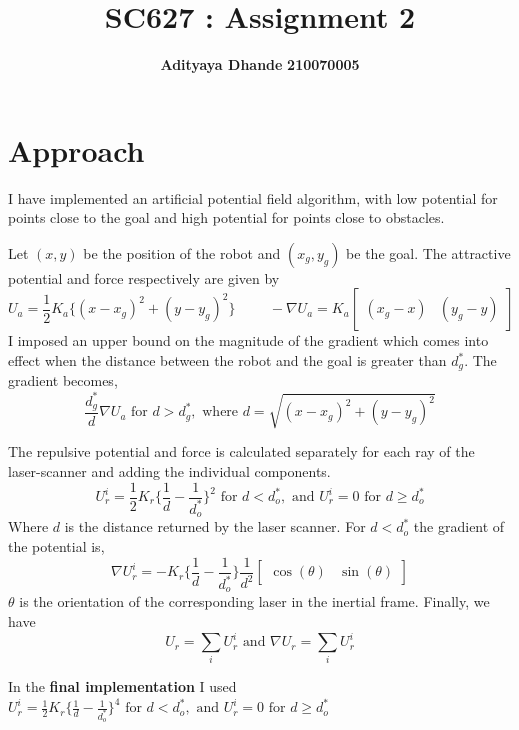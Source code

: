 \documentclass[11pt]{article}
\title{\textbf{SC627 : Assignment 2}}
\author{\textbf{Adityaya Dhande}   \hspace{8mm} \textbf{210070005}}
\date{}
\begin{document}
\maketitle
\noindent
\section{Approach}
I have implemented an artificial potential field algorithm, with low potential for points close to the goal and high potential for points close to obstacles. 


Let $(x, y)$ be the position of the robot and $(x_g, y_g)$ be the goal. The attractive potential and force respectively are given by 
\begin{equation*}
    U_a = \frac{1}{2} K_a \{(x - x_g)^2 + (y-y_g)^2\} \hspace{1cm} -\nabla U_a = K_a \begin{bmatrix}
        (x_g - x) & (y_g - y)
    \end{bmatrix} 
\end{equation*}
I imposed an upper bound on the magnitude of the gradient which comes into effect when the distance between the robot and the goal is greater than $d^*_g$.
The gradient becomes,
 $$  \frac{d^*_g}{d} \nabla U_a \text{ for } d > d^*_g, \text{ where } d = \sqrt{(x-x_g)^2 + (y-y_g)^2}$$
 
The repulsive potential and force is calculated separately for each ray of the laser-scanner and adding the individual components. 
\begin{equation*}
    U_r^i = \frac{1}{2} K_r \{
        \frac{1}{d} - \frac{1}{d^*_o}
    \}^2 \text{ for } d < d^*_o, \text{ and } U_r^i = 0 \text{ for }  d \geq d^*_o
\end{equation*}
Where $d$ is the distance returned by the laser scanner. For $d < d^*_o$ the gradient of the potential is,
$$ \nabla U_r^i = - K_r \{\frac{1}{d} - \frac{1}{d^*_o}\}\frac{1}{d^2} \begin{bmatrix}
    \cos(\theta) & \sin(\theta)
\end{bmatrix} $$
$\theta$ is the orientation of the corresponding laser in the inertial frame. Finally, we have
$$ U_r = \sum_i U_r^i \text{ and } \nabla U_r = \sum_i U_r^i$$

In the \textbf{final implementation} I used $U_r^i = \frac{1}{2} K_r \{
    \frac{1}{d} - \frac{1}{d^*_o}
\}^4 \text{ for } d < d^*_o, \text{ and } U_r^i = 0 \text{ for }  d \geq d^*_o$
\end{document}
